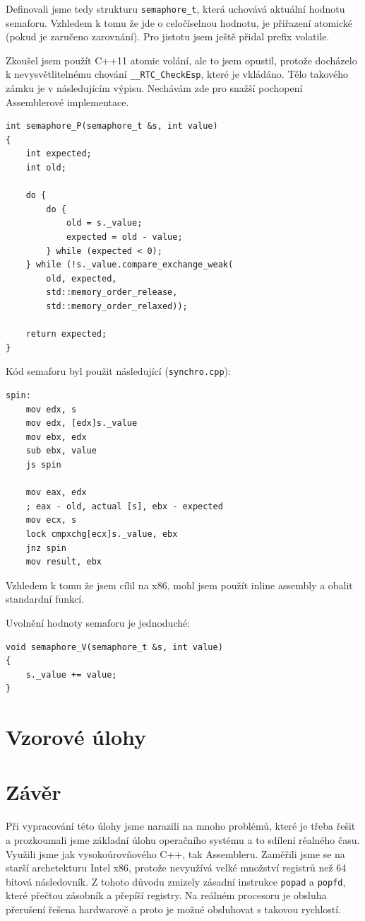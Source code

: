 \documentclass[a4paper,12pt]{article}
\begin{document}
Definovali jsme tedy strukturu \texttt{semaphore\_t}, která uchovává aktuální hodnotu
semaforu. Vzhledem k tomu že jde o celočíselnou hodnotu, je přiřazení atomické (pokud je
zaručeno zarovnání). Pro jistotu jsem ještě přidal prefix volatile.

Zkoušel jsem použít C++11 atomic volání, ale to jsem opustil, protože docházelo
k nevysvětlitelnému chování \verb+__RTC_CheckEsp+, které je vkládáno. Tělo takového
zámku je v následujícím výpisu. Nechávám zde pro snažší pochopení Assemblerové
implementace.

\begin{lstlisting}
int semaphore_P(semaphore_t &s, int value)
{
	int expected;
	int old;

	do {
		do {
			old = s._value;
			expected = old - value;
		} while (expected < 0);
	} while (!s._value.compare_exchange_weak(
		old, expected,
		std::memory_order_release,
		std::memory_order_relaxed));

	return expected;
}
\end{lstlisting}

Kód semaforu byl použit následující (\texttt{synchro.cpp}):


\begin{lstlisting}
spin:
	mov edx, s
	mov edx, [edx]s._value
	mov ebx, edx
	sub ebx, value
	js spin

	mov eax, edx
	; eax - old, actual [s], ebx - expected
	mov ecx, s
	lock cmpxchg[ecx]s._value, ebx
	jnz spin
	mov result, ebx
\end{lstlisting}

\lstset{language=C++}

Vzhledem k tomu že jsem cílil na x86, mohl jsem použít inline assembly
a obalit standardní funkcí.

Uvolnění hodnoty semaforu je jednoduché:

\begin{lstlisting}
void semaphore_V(semaphore_t &s, int value)
{
	s._value += value;
}
\end{lstlisting}

\section{Vzorové úlohy}

\section{Závěr}
Při vypracování této úlohy jsme narazili na mnoho problémů, které je třeba
řešit a prozkoumali jsme základní úlohu operačního systému a to sdílení réalného času.
Využili jsme jak vysokoúrovňového C++, tak Assembleru. Zaměřili jsme se na starší
archetekturu Intel x86, protože nevyužívá velké množství registrů než 64 bitová
následovník. Z tohoto důvodu zmizely zásadní instrukce \texttt{popad} a \texttt{popfd},
které přečtou zásobník a přepíší registry. Na reálném procesoru je obsluha přerušení řešena
hardwarově a proto je možné obsluhovat s takovou rychlostí.
\end{document}
